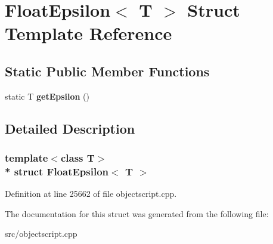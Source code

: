 \hypertarget{struct_float_epsilon}{}\section{Float\+Epsilon$<$ T $>$ Struct Template Reference}
\label{struct_float_epsilon}
\subsection*{Static Public Member Functions}
\begin{DoxyCompactItemize}
\item 
static T {\bfseries get\+Epsilon} ()\hypertarget{struct_float_epsilon_a3dd695eb26309cb1223b8bae1517faf4}{}\label{struct_float_epsilon_a3dd695eb26309cb1223b8bae1517faf4}

\end{DoxyCompactItemize}


\subsection{Detailed Description}
\subsubsection*{template$<$class T$>$\\*
struct Float\+Epsilon$<$ T $>$}



Definition at line 25662 of file objectscript.\+cpp.



The documentation for this struct was generated from the following file\+:\begin{DoxyCompactItemize}
\item 
src/objectscript.\+cpp\end{DoxyCompactItemize}
